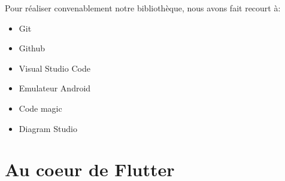\documentclass[a4paper,12pt]{report}
\begin{document}

                Pour réaliser convenablement notre bibliothèque, nous avons fait recourt à:
                
                \begin{itemize}
                    \item Git
                    \item Github
                    \item Visual Studio Code
                    \item Emulateur Android
                    \item Code magic
                    \item Diagram Studio
                \end{itemize}
                
    \chapter{Au coeur de Flutter}







    \begin{thebibliography}{2}
    \end{thebibliography}
\end{document}

